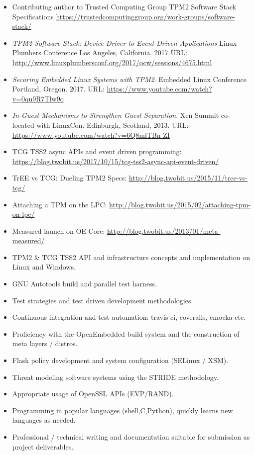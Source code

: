 \documentclass[letterpaper,11pt]{article}
\begin{document}
\begin {itemize}
  \setlength {\itemsep}{1pt}
  \setlength {\parskip}{0pt}
  \setlength {\parsep}{0pt}
  \item Contributing author to Trusted Computing Group TPM2 Software Stack Specifications
    \url {https://trustedcomputinggroup.org/work-groups/software-stack/}
  \item {\it TPM2 Software Stack: Device Driver to Event-Driven Applications}
    Linux Plumbers Conference
    Los Angeles, California.
    2017
    URL: \url {http://www.linuxplumbersconf.org/2017/ocw/sessions/4675.html}
  \item {\it Securing Embedded Linux Systems with TPM2}.
    Embedded Linux Conference
    Portland, Oregon.
    2017.
    URL: \url {https://www.youtube.com/watch?v=0qu9R7Tlw9o}
  \item {\it In-Guest Mechanisms to Strengthen Guest Separation}.
    Xen Summit co-located with LinuxCon.
    Edinburgh, Scotland,
    2013.
    URL: \url {https://www.youtube.com/watch?v=6Q8mlTBn-ZI}
  \item TCG TSS2 async APIs and event driven programming:
    \url {https://blog.twobit.us/2017/10/15/tcg-tss2-async-api-event-driven/}
  \item TrEE vs TCG: Dueling TPM2 Specs:
    \url {http://blog.twobit.us/2015/11/tree-vs-tcg/}
  \item Attaching a TPM on the LPC:
    \url {http://blog.twobit.us/2015/02/attaching-tpm-on-lpc/}
  \item Measured launch on OE-Core:
    \url {http://blog.twobit.us/2013/01/meta-measured/}
\end{itemize}

\begin {itemize}
  \setlength {\itemsep}{1pt}
  \setlength {\parskip}{0pt}
  \setlength {\parsep}{0pt}
  \item TPM2 \& TCG TSS2 API and infrastructure concepts and implementation
    on Linux and Windows.
  \item GNU Autotools build and parallel test harness.
  \item Test strategies and test driven development methodologies.
  \item Continuous integration and test automation: travis-ci, coveralls,
    cmocka etc.
  \item Proficiency with the OpenEmbedded build system and the construction of meta layers / distros.
  \item Flask policy development and system configuration (SELinux / XSM).
  \item Threat modeling software systems using the STRIDE methodology.
  \item Appropriate usage of OpenSSL APIs (EVP/RAND).
  \item Programming in popular languages (shell,C,Python), quickly learns new languages as needed.
  \item Professional / technical writing and documentation suitable for submission as project deliverables.
\end {itemize}
\end{document}
